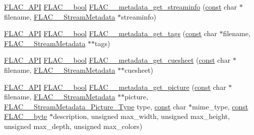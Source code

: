 \begin{DoxyCompactItemize}
\item 
\hyperlink{group__flac__export_ga56ca07df8a23310707732b1c0007d6f5}{F\+L\+A\+C\+\_\+\+A\+PI} \hyperlink{ordinals_8h_a95103469f1cbd78b8cf250194985b34e}{F\+L\+A\+C\+\_\+\+\_\+bool} \hyperlink{group__flac__metadata__level0_gaf248d1ccc8025b9e9d7f532b8af4ab07}{F\+L\+A\+C\+\_\+\+\_\+metadata\+\_\+get\+\_\+streaminfo} (\hyperlink{zconf_8h_a2c212835823e3c54a8ab6d95c652660e}{const} char $\ast$filename, \hyperlink{struct_f_l_a_c_____stream_metadata}{F\+L\+A\+C\+\_\+\+\_\+\+Stream\+Metadata} $\ast$streaminfo)
\item 
\hyperlink{group__flac__export_ga56ca07df8a23310707732b1c0007d6f5}{F\+L\+A\+C\+\_\+\+A\+PI} \hyperlink{ordinals_8h_a95103469f1cbd78b8cf250194985b34e}{F\+L\+A\+C\+\_\+\+\_\+bool} \hyperlink{group__flac__metadata__level0_gaf66469f31dca28837ffd3f8b0ec5c082}{F\+L\+A\+C\+\_\+\+\_\+metadata\+\_\+get\+\_\+tags} (\hyperlink{zconf_8h_a2c212835823e3c54a8ab6d95c652660e}{const} char $\ast$filename, \hyperlink{struct_f_l_a_c_____stream_metadata}{F\+L\+A\+C\+\_\+\+\_\+\+Stream\+Metadata} $\ast$$\ast$tags)
\item 
\hyperlink{group__flac__export_ga56ca07df8a23310707732b1c0007d6f5}{F\+L\+A\+C\+\_\+\+A\+PI} \hyperlink{ordinals_8h_a95103469f1cbd78b8cf250194985b34e}{F\+L\+A\+C\+\_\+\+\_\+bool} \hyperlink{group__flac__metadata__level0_ga6ee2633dc179c2a0cb5fef5762faf0fd}{F\+L\+A\+C\+\_\+\+\_\+metadata\+\_\+get\+\_\+cuesheet} (\hyperlink{zconf_8h_a2c212835823e3c54a8ab6d95c652660e}{const} char $\ast$filename, \hyperlink{struct_f_l_a_c_____stream_metadata}{F\+L\+A\+C\+\_\+\+\_\+\+Stream\+Metadata} $\ast$$\ast$cuesheet)
\item 
\hyperlink{group__flac__export_ga56ca07df8a23310707732b1c0007d6f5}{F\+L\+A\+C\+\_\+\+A\+PI} \hyperlink{ordinals_8h_a95103469f1cbd78b8cf250194985b34e}{F\+L\+A\+C\+\_\+\+\_\+bool} \hyperlink{group__flac__metadata__level0_gaa13138ab038694909964998a113817b4}{F\+L\+A\+C\+\_\+\+\_\+metadata\+\_\+get\+\_\+picture} (\hyperlink{zconf_8h_a2c212835823e3c54a8ab6d95c652660e}{const} char $\ast$filename, \hyperlink{struct_f_l_a_c_____stream_metadata}{F\+L\+A\+C\+\_\+\+\_\+\+Stream\+Metadata} $\ast$$\ast$picture, \hyperlink{group__flac__format_gaf6d3e836cee023e0b8d897f1fdc9825d}{F\+L\+A\+C\+\_\+\+\_\+\+Stream\+Metadata\+\_\+\+Picture\+\_\+\+Type} type, \hyperlink{zconf_8h_a2c212835823e3c54a8ab6d95c652660e}{const} char $\ast$mime\+\_\+type, \hyperlink{zconf_8h_a2c212835823e3c54a8ab6d95c652660e}{const} \hyperlink{ordinals_8h_a5eb569b12d5b047cdacada4d57924ee3}{F\+L\+A\+C\+\_\+\+\_\+byte} $\ast$description, unsigned max\+\_\+width, unsigned max\+\_\+height, unsigned max\+\_\+depth, unsigned max\+\_\+colors)
\end{DoxyCompactItemize}


